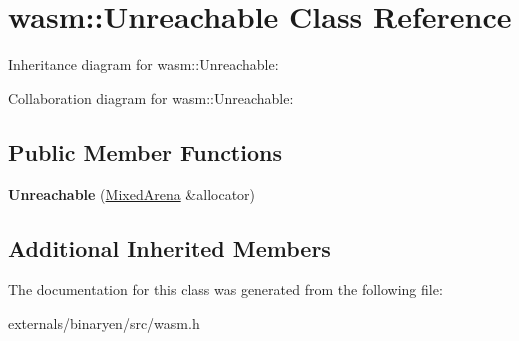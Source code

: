 \hypertarget{classwasm_1_1_unreachable}{}\section{wasm\+:\+:Unreachable Class Reference}
\label{classwasm_1_1_unreachable}


Inheritance diagram for wasm\+:\+:Unreachable\+:


Collaboration diagram for wasm\+:\+:Unreachable\+:
\subsection*{Public Member Functions}
\begin{DoxyCompactItemize}
\item 
\mbox{\label{classwasm_1_1_unreachable_a95c39ce85e989fd949520e8f98c35e9e}} 
{\bfseries Unreachable} (\mbox{\hyperlink{struct_mixed_arena}{Mixed\+Arena}} \&allocator)
\end{DoxyCompactItemize}
\subsection*{Additional Inherited Members}


The documentation for this class was generated from the following file\+:\begin{DoxyCompactItemize}
\item 
externals/binaryen/src/wasm.\+h\end{DoxyCompactItemize}
